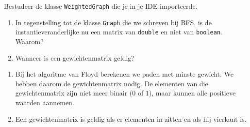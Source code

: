 \begin{oef}
\code \papier Bestudeer de klasse \verb/WeightedGraph/ die je in je IDE importeerde. 
\begin{enumerate}
\item In tegenstelling tot de klasse \verb/Graph/ die we schreven bij BFS, is de instantieveranderlijke nu een matrix van \verb/double/ en niet van \verb/boolean/. Waarom?
\item Wanneer is een gewichtenmatrix geldig?
\end{enumerate}
\begin{opl}
\begin{enumerate}
\item Bij het algoritme van Floyd berekenen we  paden met minste gewicht. We hebben daarom de gewichtenmatrix nodig. De elementen van die gewichtenmatrix zijn niet meer binair ($0$ of $1$), maar kunnen alle positieve waarden aannemen.
\item Een gewichtenmatrix is geldig als er elementen in zitten en als hij vierkant is.
\end{enumerate}

\end{opl}
\end{oef}

